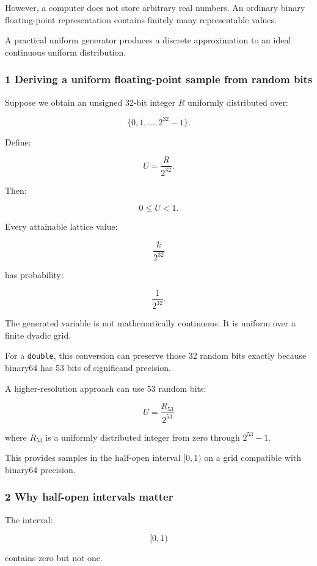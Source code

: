 However, a computer does not store arbitrary real numbers. An ordinary binary floating-point representation contains finitely many representable values.

A practical uniform generator produces a discrete approximation to an ideal continuous uniform distribution.

\subsubsection{1 Deriving a uniform floating-point sample from random bits}\label{02-foundations-ii-ch029-deriving-a-uniform-floating-point-sample-from-random-bits}

Suppose we obtain an unsigned 32-bit integer \(R\) uniformly distributed over:

\[
 \{0,1,\ldots,2^{32}-1\}.
\]

Define:

\[
 \boxed{U=\frac{R}{2^{32}}}.
\]

Then:

\[
 0\le U<1.
\]

Every attainable lattice value:

\[
 \frac{k}{2^{32}}
\]

has probability:

\[
 \frac1{2^{32}}.
\]

The generated variable is not mathematically continuous. It is uniform over a finite dyadic grid.

For a \texttt{double}, this conversion can preserve those 32 random bits exactly because binary64 has 53 bits of significand precision.

A higher-resolution approach can use 53 random bits:

\[
 \boxed{ U=\frac{R_{53}}{2^{53}} }
\]

where \(R_{53}\) is a uniformly distributed integer from zero through \(2^{53}-1\).

This provides samples in the half-open interval \([0,1)\) on a grid compatible with binary64 precision.

\subsubsection{2 Why half-open intervals matter}\label{02-foundations-ii-ch029-why-half-open-intervals-matter}

The interval:

\[
 [0,1)
\]

contains zero but not one.

